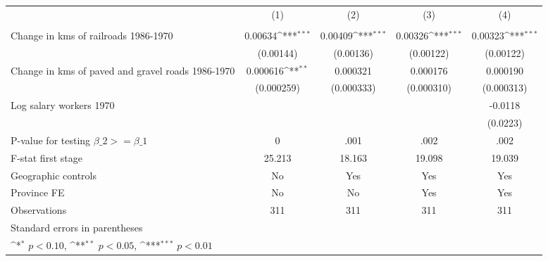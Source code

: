 {
\def\sym#1{\ifmmode^{#1}\else\(^{#1}\)\fi}
\begin{tabular}{l*{4}{c}}
\hline\hline
                &\multicolumn{1}{c}{(1)}&\multicolumn{1}{c}{(2)}&\multicolumn{1}{c}{(3)}&\multicolumn{1}{c}{(4)}\\
                &\multicolumn{1}{c}{}&\multicolumn{1}{c}{}&\multicolumn{1}{c}{}&\multicolumn{1}{c}{}\\
\hline
Change in kms of railroads 1986-1970&  0.00634\sym{***}&  0.00409\sym{***}&  0.00326\sym{***}&  0.00323\sym{***}\\
                &(0.00144)         &(0.00136)         &(0.00122)         &(0.00122)         \\
[1em]
Change in kms of paved and gravel roads 1986-1970& 0.000616\sym{**} & 0.000321         & 0.000176         & 0.000190         \\
                &(0.000259)         &(0.000333)         &(0.000310)         &(0.000313)         \\
[1em]
Log salary workers 1970&                  &                  &                  &  -0.0118         \\
                &                  &                  &                  & (0.0223)         \\
\hline
P-value for testing $\beta\_{2} >= \beta\_{1}$&        0         &     .001         &     .002         &     .002         \\
F-stat first stage&   25.213         &   18.163         &   19.098         &   19.039         \\
Geographic controls&       No         &      Yes         &      Yes         &      Yes         \\
Province FE     &       No         &       No         &      Yes         &      Yes         \\
Observations    &      311         &      311         &      311         &      311         \\
\hline\hline
\multicolumn{5}{l}{\footnotesize Standard errors in parentheses}\\
\multicolumn{5}{l}{\footnotesize \sym{*} \(p<0.10\), \sym{**} \(p<0.05\), \sym{***} \(p<0.01\)}\\
\end{tabular}
}
